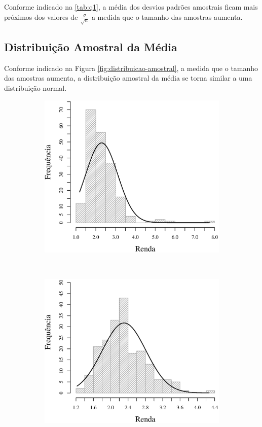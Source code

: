 	Conforme indicado na \autoref{tab:q1}, a média dos desvios padrões
	amostrais ficam mais próximos dos valores de $\frac{\sigma}{\sqrt{n}}$ a
	medida que o tamanho das amostras aumenta.

\subsection{Distribuição Amostral da Média}

	Conforme indicado na Figura \ref{fig:distribuicao-amostral}, a medida
	que o tamanho das amostras aumenta, a distribuição amostral da média se
	torna similar a uma distribuição normal.

\begin{figure}
	\centering
	\begin{subfigure}[b]{0.48\textwidth}
		\includegraphics[width=\textwidth]{plots/histogram_renda_n4.eps}
		\caption{}
		\label{fig:m4}
	\end{subfigure}
	~
	\begin{subfigure}[b]{0.48\textwidth}
		\includegraphics[width=\textwidth]{plots/histogram_renda_n8.eps}

\end{subfigure}
\end{figure}
